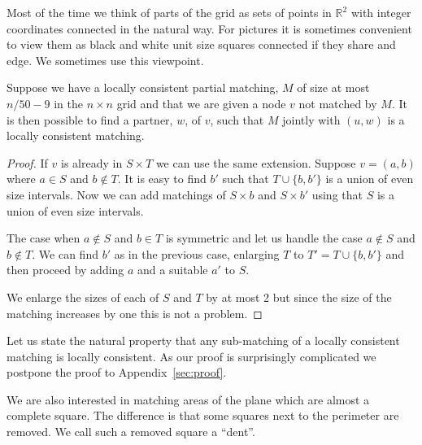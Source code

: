 \documentclass{theoretics}
\makeatletter
\newcommand\IfRestateTF{%
  \ifx\label\thmt@gobble@label %
    \expandafter\@firstoftwo
  \else
    \expandafter\@secondoftwo
  \fi
}
\newcommand{\RestateRemark}{\IfRestateTF{{\normalfont\bfseries (Restated) }}{}}
\makeatother
\begin{document}
Most of the time we think of parts of the grid as sets of
points in $\mathbb R^2$ with integer coordinates connected
in the natural way.  For pictures it is sometimes convenient
to view them as black and white unit size squares connected
if they share and edge.  We sometimes use this viewpoint.

\begin{lemma}\label{lemma:cons}
Suppose we have a locally consistent partial matching, $M$ of size at
most $n/50-9$ in the $n \times n$ grid and that we are given
a node $v$ not matched
by $M$.  It is then possible to find a partner, $w$, of $v$, 
such that $M$ jointly with $(u,w)$ is a locally
consistent matching.
\end{lemma}

\begin{proof}
If $v$ is already in $S \times T$ we can use the same extension.
Suppose $v=(a,b)$ where $a \in S$ and $b \not\in T$.
It is easy to find $b'$ such that $T \cup \{ b, b'\}$
is a union of even size intervals.  Now we can add matchings
of $S \times b$ and $S \times b'$ using that $S$ is a union
of even size intervals.

The case when $a \not\in S$ and $b \in T$ is symmetric
and let us handle the case $a \not \in S$ and $b \not\in T$.
We can find $b'$ as in the previous case, enlarging $T$
to $T'= T \cup \{ b, b'\}$ and then proceed by
adding $a$ and a suitable $a'$ to $S$.

We enlarge the sizes of each of $S$ and $T$ by at most 2 but since
the size of the matching increases by one this is not a problem.
\end{proof}

Let us state the natural property that
any sub-matching of a locally consistent matching is
locally consistent.  As our proof is surprisingly
complicated we postpone the proof to Appendix~\ref{sec:proof}.


We are also interested in matching areas of the plane
which are almost a complete square.  The difference
is that some squares next to the perimeter are
removed.  We call such a removed square a ``dent''.
\end{document}
